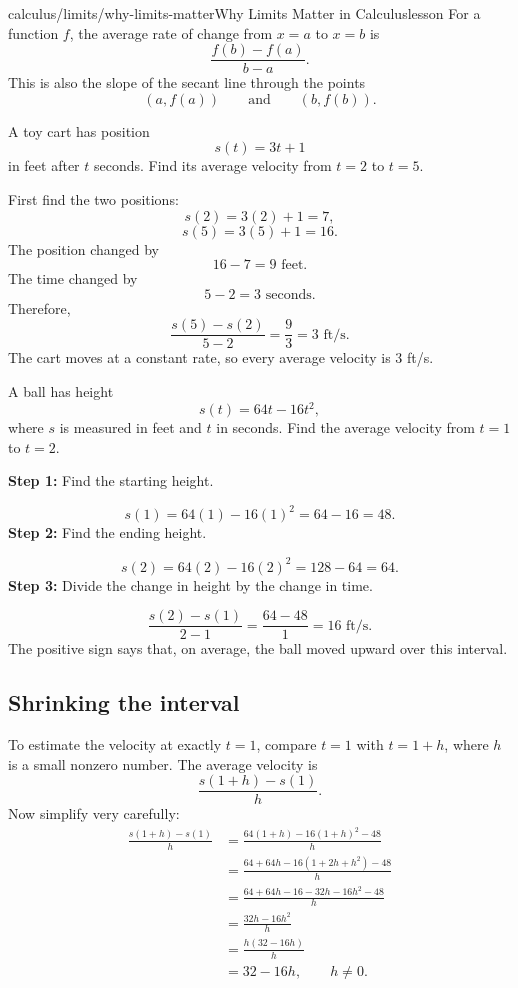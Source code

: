 \documentclass[11pt,openany]{book}
\theoremstyle{bgplain}
\newcounter{bgexample}[chapter]
\newcommand{\step}[2]{\textbf{Step #1:} #2\par}
\begin{document}
\begin{webpage}{calculus/limits/why-limits-matter}{Why Limits Matter in Calculus}{lesson}
For a function \(f\), the average rate of change from \(x=a\) to \(x=b\) is
\[
  \boxed{\frac{f(b)-f(a)}{b-a}}.
\]
This is also the slope of the secant line through the points
\[
  (a,f(a))\qquad\text{and}\qquad(b,f(b)).
\]

\begin{bgguided}[title={A straight-moving cart}]
A toy cart has position
\[
  s(t)=3t+1
\]
in feet after \(t\) seconds. Find its average velocity from \(t=2\) to \(t=5\).

\begin{bgsolution}
First find the two positions:
\[
  s(2)=3(2)+1=7,
\]
\[
  s(5)=3(5)+1=16.
\]
The position changed by
\[
  16-7=9\text{ feet}.
\]
The time changed by
\[
  5-2=3\text{ seconds}.
\]
Therefore,
\[
  \frac{s(5)-s(2)}{5-2}
  =\frac{9}{3}
  =\boxed{3\text{ ft/s}}.
\]
The cart moves at a constant rate, so every average velocity is \(3\) ft/s.
\end{bgsolution}
\end{bgguided}

\begin{bgexample}[title={A ball thrown upward}]
A ball has height
\[
  s(t)=64t-16t^2,
\]
where \(s\) is measured in feet and \(t\) in seconds. Find the average velocity from \(t=1\) to \(t=2\).

\begin{bgsolution}
\step{1}{Find the starting height.}
\[
  s(1)=64(1)-16(1)^2=64-16=48.
\]
\step{2}{Find the ending height.}
\[
  s(2)=64(2)-16(2)^2=128-64=64.
\]
\step{3}{Divide the change in height by the change in time.}
\[
  \frac{s(2)-s(1)}{2-1}
  =\frac{64-48}{1}
  =\boxed{16\text{ ft/s}}.
\]
The positive sign says that, on average, the ball moved upward over this interval.
\end{bgsolution}
\end{bgexample}

\subsection{Shrinking the interval}

To estimate the velocity at exactly \(t=1\), compare \(t=1\) with \(t=1+h\), where \(h\) is a small nonzero number. The average velocity is
\[
  \frac{s(1+h)-s(1)}{h}.
\]
Now simplify very carefully:
\begin{align*}
\frac{s(1+h)-s(1)}{h}
&=\frac{64(1+h)-16(1+h)^2-48}{h}\\
&=\frac{64+64h-16(1+2h+h^2)-48}{h}\\
&=\frac{64+64h-16-32h-16h^2-48}{h}\\
&=\frac{32h-16h^2}{h}\\
&=\frac{h(32-16h)}{h}\\
&=32-16h,\qquad h\ne0.
\end{align*}


\end{webpage}
\end{document}
